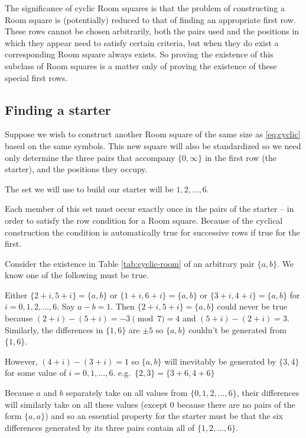 \documentclass[
  11pt,
  a4paper]{book}
\begin{document}
The significance of cyclic Room squares is that the problem of
constructing a Room square is (potentially) reduced to that of finding
an appropriate first row. These rows cannot be chosen arbitrarily, both
the pairs used and the positions in which they appear need to satisfy
certain criteria, but when they do exist a corresponding Room square
always exists. So proving the existence of this subclass of Room squares
is a matter only of proving the existence of these special first rows.

\hypertarget{finding-a-starter}{%
\subsection{Finding a starter}\label{finding-a-starter}}

Suppose we wish to construct another Room square of the same size as
\eqref{eq:cyclic} based on the same symbols. This new square will also
be standardized so we need only determine the three pairs that accompany
\(\{0, \infty\}\) in the first row (the starter), and the positions they
occupy.

The set we will use to build our starter will be \({1, 2, \ldots, 6}\).

Each member of this set must occur exactly once in the pairs of the
starter -- in order to satisfy the row condition for a Room square.
Because of the cyclical construction the condition is automatically true
for successive rows if true for the first.

Consider the existence in Table \ref{tab:cyclic-room} of an arbitrary
pair \(\{a, b\}\). We know one of the following must be true.

Either \(\{2 + i, 5 + i\} = \{a, b\}\) or
\(\{1 + i, 6 + i\} = \{a, b\}\) or \(\{3 + i, 4 + i\} = \{a, b\}\) for
\(i = 0, 1, 2, \ldots, 6\). Say \(a - b = 1\). Then
\(\{2 + i, 5 + i\} = \{a, b\}\) could never be true because
\((2 + i) - (5 + i) = -3\pmod 7 = 4\) and \((5 + i) - (2 + i) = 3\).
Similarly, the differences in \(\{1, 6\}\) are \(\pm 5\) so \(\{a, b\}\)
couldn't be generated from \(\{1, 6\}\).

However, \((4 + i) - (3 + i) = 1\) so \(\{a, b\}\) will inevitably be
generated by \(\{3, 4\}\) for some value of \(i = 0, 1, \ldots, 6\).
e.g.~\(\{2, 3\} = \{3 + 6, 4 + 6\}\)

Because \(a\) and \(b\) separately take on all values from
\(\{0, 1, 2, \ldots, 6\}\), their differences will similarly take on all
these values (except 0 because there are no pairs of the form
\(\{a, a\}\)) and so an essential property for the starter must be that
the six differences generated by its three pairs contain all of
\(\{1, 2, \ldots, 6\}\).
\end{document}
